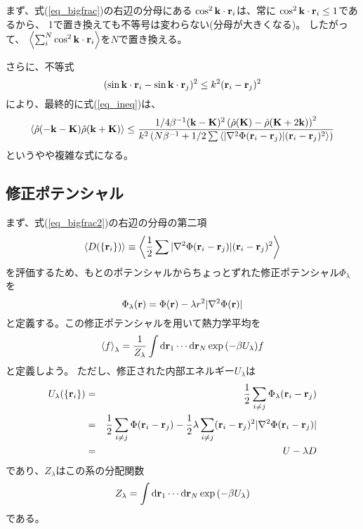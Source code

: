 \documentclass{jarticle}
\renewcommand{\v}[1]{{\bf #1}}
\newcommand{\ave}[1]{\left< #1 \right>}
\newcommand{\hr}{\hat{\rho}}
\begin{document}
まず、式(\ref{eq_bigfrac})の右辺の分母にある
$\cos^2{\v{k}\cdot\v{r}_i}$は、常に
$\cos^2{\v{k}\cdot\v{r}_i} \le 1$であるから、
1で置き換えても不等号は変わらない(分母が大きくなる)。
したがって、
$\ave{\sum_i^N \cos^2{\v{k}\cdot\v{r}_i}}$を$N$で置き換える。

さらに、不等式
\begin{equation}
  (\sin{ \v{k} \cdot \v{r}_i} - \sin{\v{k}\cdot \v{r}_j})^2 \le k^2 (\v{r}_i-\v{r}_j)^2
\end{equation}
により、最終的に式(\ref{eq_ineq})は、
\begin{equation}
  \ave{\hat{\rho}(-\v{k}-\v{K}) \hat{\rho}(\v{k}+\v{K})}
  \le
  \frac{
    1/4 \beta^{-1} (\v{k} - \v{K})^2
    \left( \hr(\v{K})-\hr(\v{K}+2\v{k}) \right)^2
  }{
    k^2 \left(
    N \beta^{-1} + 1/2 \sum \ave{|\nabla^2 \Phi(\v{r}_i-\v{r}_j)| (\v{r}_i-\v{r}_j)^2}
    \right)
  }
  \label{eq_bigfrac2}
\end{equation}
というやや複雑な式になる。

\subsection{修正ポテンシャル}
\label{sec_modpotential}

まず、式(\ref{eq_bigfrac2})の右辺の分母の第二項
\begin{equation}
  \ave{D(\{ \v{r}_i \})} \equiv \ave{\frac{1}{2} \sum |\nabla^2 \Phi(\v{r}_i-\v{r}_j)| (\v{r}_i-\v{r}_j)^2}
  \label{eq_defD}
\end{equation}
を評価するため、もとのポテンシャルからちょっとずれた修正ポテンシャル$\Phi_{\lambda}$を
\begin{equation}
  \Phi_\lambda(\v{r})= \Phi(\v{r}) - \lambda r^2 |\nabla^2 \Phi(\v{r})|
\end{equation}
と定義する。この修正ポテンシャルを用いて熱力学平均を
\begin{equation}
  \ave{f}_\lambda = \frac{1}{Z_\lambda} \int \mbox{d} \v{r}_1 \cdots \mbox{d}\v{r}_N \exp{(-\beta U_\lambda)} f
\end{equation}
と定義しよう。
ただし、修正された内部エネルギー$U_\lambda$は
\begin{eqnarray}
  U_\lambda(\{ \v{r}_i \}) &=& \frac{1}{2} \sum_{i \neq j} \Phi_\lambda(\v{r}_i - \v{r}_j)\\
  &=& \frac{1}{2} \sum_{i \neq j} \Phi(\v{r}_i - \v{r}_j) -
  \frac{1}{2} \lambda \sum_{i \neq j} (\v{r}_i - \v{r}_j)^2 |\nabla^2 \Phi(\v{r}_i-\v{r}_j)| \\
  &=& U - \lambda D
\end{eqnarray}
であり、$Z_\lambda$はこの系の分配関数
\begin{equation}
  Z_\lambda = \int \mbox{d} \v{r}_1 \cdots \mbox{d}\v{r}_N \exp{(-\beta U_\lambda)}
\end{equation}
である。
\end{document}
